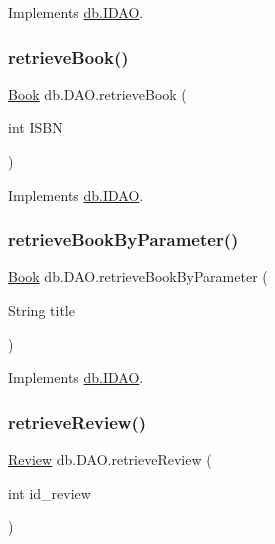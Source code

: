 Implements \hyperlink{interfacedb_1_1_i_d_a_o_a88b60729d9517ca9aa31b7db7ae07aee}{db.\+I\+D\+AO}.

\mbox{\label{classdb_1_1_d_a_o_ade778f907d0a74dc27c4fc03f8709815}} 
\subsubsection{\texorpdfstring{retrieve\+Book()}{retrieveBook()}}
{\footnotesize\ttfamily \hyperlink{classserver_1_1data_1_1_book}{Book} db.\+D\+A\+O.\+retrieve\+Book (\begin{DoxyParamCaption}\item[{int}]{I\+S\+BN }\end{DoxyParamCaption})}



Implements \hyperlink{interfacedb_1_1_i_d_a_o_a1457ecf91799eaacd17cd3259826fc36}{db.\+I\+D\+AO}.

\mbox{\label{classdb_1_1_d_a_o_a1f8580da682f8a8af4896c491c3b6611}} 
\subsubsection{\texorpdfstring{retrieve\+Book\+By\+Parameter()}{retrieveBookByParameter()}}
{\footnotesize\ttfamily \hyperlink{classserver_1_1data_1_1_book}{Book} db.\+D\+A\+O.\+retrieve\+Book\+By\+Parameter (\begin{DoxyParamCaption}\item[{String}]{title }\end{DoxyParamCaption})}



Implements \hyperlink{interfacedb_1_1_i_d_a_o_a4c5eda35bfbba1b0a994efe00f99a544}{db.\+I\+D\+AO}.

\mbox{\label{classdb_1_1_d_a_o_ae43e182fae8ee7028db6ff17c2d5768f}} 
\subsubsection{\texorpdfstring{retrieve\+Review()}{retrieveReview()}}
{\footnotesize\ttfamily \hyperlink{classserver_1_1data_1_1_review}{Review} db.\+D\+A\+O.\+retrieve\+Review (\begin{DoxyParamCaption}\item[{int}]{id\+\_\+review }\end{DoxyParamCaption})}



